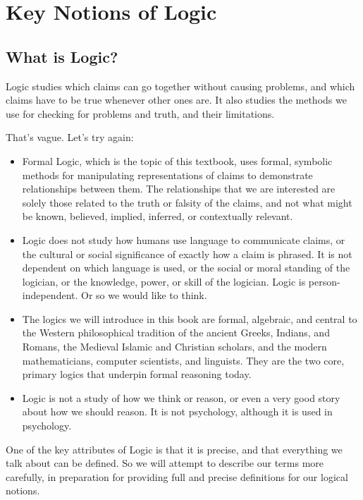 \documentclass[PHIL101-Textbook.tex]{subfiles}
\begin{document}
\part{Key Notions of Logic}\label{part:intro}

\chapter{What is Logic?}\label{ch:WhatIsLogic}

Logic studies which claims can go together without causing problems, and which claims have to be true whenever other ones are. It also studies the methods we use for checking for problems and truth, and their limitations.

That's vague. Let's try again:

\begin{itemize}
\item Formal Logic, which is the topic of this textbook, uses formal, symbolic methods for manipulating representations of claims to demonstrate relationships between them. The relationships that we are interested are solely those related to the truth or falsity of the claims, and not what might be known, believed, implied, inferred, or contextually relevant.

\item Logic does not study how humans use language to communicate claims, or the cultural or social significance of exactly how a claim is phrased. It is not dependent on which language is used, or the social or moral standing of the logician, or the knowledge, power, or skill of the logician. Logic is person-independent. Or so we would like to think.

\item The logics we will introduce in this book are formal, algebraic, and central to the Western philosophical tradition of the ancient Greeks, Indians, and Romans, the Medieval Islamic and Christian scholars, and the modern mathematicians, computer scientists, and linguists. They are the two core, primary logics that underpin formal reasoning today.


\item Logic is not a study of how we think or reason, or even a very good story about how we should reason. It is not psychology, although it is used in psychology.
\end{itemize}


One of the key attributes of Logic is that it is precise, and that everything we talk about can be defined. So we will attempt to describe our terms more carefully, in preparation for providing full and precise definitions for our logical notions.
\end{document}
